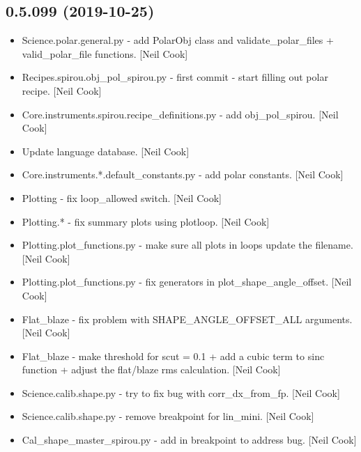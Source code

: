 \documentclass[a4paper,10pt,english]{report}
\begin{document}
\subsection{0.5.099 (2019-10-25)}
\label{\detokenize{misc/changelog:id42}}\begin{itemize}
\item {} 
Science.polar.general.py - add PolarObj class and validate\_polar\_files
+ valid\_polar\_file functions. {[}Neil Cook{]}

\item {} 
Recipes.spirou.obj\_pol\_spirou.py - first commit - start filling out
polar recipe. {[}Neil Cook{]}

\item {} 
Core.instruments.spirou.recipe\_definitions.py - add obj\_pol\_spirou.
{[}Neil Cook{]}

\item {} 
Update language database. {[}Neil Cook{]}

\item {} 
Core.instruments.*.default\_constants.py - add polar constants. {[}Neil
Cook{]}

\item {} 
Plotting - fix loop\_allowed switch. {[}Neil Cook{]}

\item {} 
Plotting.* - fix summary plots using plotloop. {[}Neil Cook{]}

\item {} 
Plotting.plot\_functions.py - make sure all plots in loops update the
filename. {[}Neil Cook{]}

\item {} 
Plotting.plot\_functions.py - fix generators in
plot\_shape\_angle\_offset. {[}Neil Cook{]}

\item {} 
Flat\_blaze - fix problem with SHAPE\_ANGLE\_OFFSET\_ALL arguments. {[}Neil
Cook{]}

\item {} 
Flat\_blaze - make threshold for scut = 0.1 + add a cubic term to sinc
function + adjust the flat/blaze rms calculation. {[}Neil Cook{]}

\item {} 
Science.calib.shape.py - try to fix bug with corr\_dx\_from\_fp. {[}Neil
Cook{]}

\item {} 
Science.calib.shape.py - remove breakpoint for lin\_mini. {[}Neil Cook{]}

\item {} 
Cal\_shape\_master\_spirou.py - add in breakpoint to address bug. {[}Neil
Cook{]}


\end{itemize}
\end{document}

